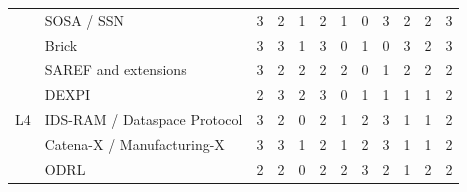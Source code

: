 \begin{table}[t]
\begin{tabular}{@{}llcccccccccc@{}}
 & SOSA / SSN \cite{haller2019ssn} & 3 & 2 & 1 & 2 & 1 & 0 & 3 & 2 & 2 & 3 \\
 & Brick \cite{balaji2016brick} & 3 & 3 & 1 & 3 & 0 & 1 & 0 & 3 & 2 & 3 \\
 & SAREF and extensions \cite{etsi2020saref} & 3 & 2 & 2 & 2 & 2 & 0 & 1 & 2 & 2 & 2 \\
 & DEXPI \cite{dexpi} & 2 & 3 & 2 & 3 & 0 & 1 & 1 & 1 & 1 & 2 \\
\midrule
L4 & IDS-RAM / Dataspace Protocol \cite{idsa2022ram} & 3 & 2 & 0 & 2 & 1 & 2 & 3 & 1 & 1 & 2 \\
 & Catena-X / Manufacturing-X \cite{catenax} & 3 & 3 & 1 & 2 & 1 & 2 & 3 & 1 & 1 & 2 \\
 & ODRL \cite{w3c2018odrl} & 2 & 2 & 0 & 2 & 2 & 3 & 2 & 1 & 2 & 2 \\
\bottomrule
\end{tabular}
\end{table}

